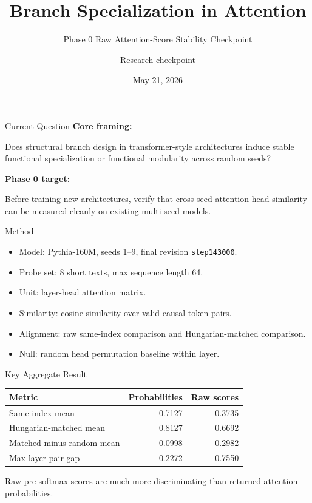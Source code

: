 \documentclass[aspectratio=169]{beamer}
\title{Branch Specialization in Attention}
\subtitle{Phase 0 Raw Attention-Score Stability Checkpoint}
\author{Research checkpoint}
\date{May 21, 2026}
\begin{document}
\begin{frame}
  \titlepage
\end{frame}

\begin{frame}{Current Question}
  \textbf{Core framing:}

  Does structural branch design in transformer-style architectures induce stable
  functional specialization or functional modularity across random seeds?

  \vspace{0.6em}
  \textbf{Phase 0 target:}

  Before training new architectures, verify that cross-seed attention-head
  similarity can be measured cleanly on existing multi-seed models.
\end{frame}

\begin{frame}{Method}
  \begin{itemize}
    \item Model: Pythia-160M, seeds 1--9, final revision \texttt{step143000}.
    \item Probe set: 8 short texts, max sequence length 64.
    \item Unit: layer-head attention matrix.
    \item Similarity: cosine similarity over valid causal token pairs.
    \item Alignment: raw same-index comparison and Hungarian-matched comparison.
    \item Null: random head permutation baseline within layer.
  \end{itemize}
\end{frame}

\begin{frame}{Key Aggregate Result}
  \begin{table}
    \centering
    \begin{tabular}{lrr}
      \toprule
      Metric & Probabilities & Raw scores \\
      \midrule
      Same-index mean & 0.7127 & 0.3735 \\
      Hungarian-matched mean & 0.8127 & 0.6692 \\
      Matched minus random mean & 0.0998 & 0.2982 \\
      Max layer-pair gap & 0.2272 & 0.7550 \\
      \bottomrule
    \end{tabular}
  \end{table}

  Raw pre-softmax scores are much more discriminating than returned attention
  probabilities.
\end{frame}
\end{document}
